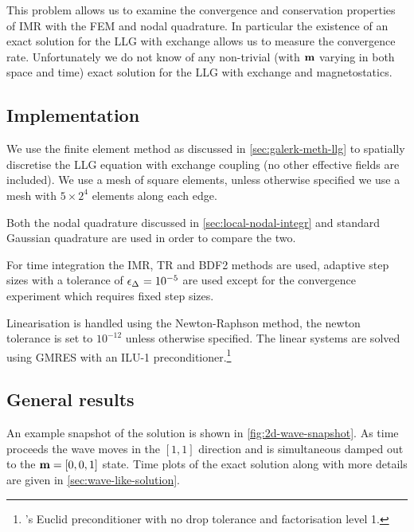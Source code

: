 This problem allows us to examine the convergence and conservation properties of IMR with the FEM and nodal quadrature.
In particular the existence of an exact solution for the LLG with exchange allows us to measure the convergence rate.
Unfortunately we do not know of any non-trivial (\ie with $\boldsymbol{\mathrm{m}}$ varying in both space and time) exact solution for the LLG with exchange and magnetostatics.


\subsection{Implementation}

We use the finite element method as discussed in \cref{sec:galerk-meth-llg} to spatially discretise the LLG equation with exchange coupling (no other effective fields are included).
We use a mesh of square elements, %
unless otherwise specified we use a mesh with $5 \times 2^4$ elements along each edge.

Both the nodal quadrature discussed in \cref{sec:local-nodal-integr} and standard Gaussian quadrature are used in order to compare the two.

For time integration the IMR, TR and BDF2 methods are used, adaptive step sizes with a tolerance of $\epsilon_{\Delta_{}} = 10^{-5}$ are used except for the convergence experiment which requires fixed step sizes.

Linearisation is handled using the Newton-Raphson method, the newton tolerance is set to $10^{-12}$ unless otherwise specified.
The linear systems are solved using GMRES with an ILU-1 preconditioner.\footnote{\hypre's Euclid preconditioner \cite{hypre} with no drop tolerance and factorisation level 1.}


\subsection{General results}


An example snapshot of the solution is shown in \cref{fig:2d-wave-snapshot}.
As time proceeds the wave moves in the $[1,1]$ direction and is simultaneous damped out to the $\boldsymbol{\mathrm{m}} = [0,0,1]$ state.
Time plots of the exact solution along with more details are given in \cref{sec:wave-like-solution}.

